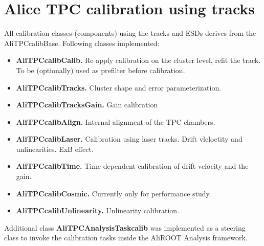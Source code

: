 \documentclass[a4paper,12pt]{article}
\begin{document}
\section{ Alice TPC calibration using tracks}


All calibration classes (components) using the tracks and ESDs derives from the AliTPCcalibBase.
Following classes implemented:
\begin{itemize}
\item {\bf{AliTPCcalibCalib.}}      Re-apply calibration on the cluster level, refit the track. To be (optionally) used as prefilter before calibration. 
\item {\bf{AliTPCcalibTracks.}}     Cluster shape and error parameterization.
\item {\bf{AliTPCcalibTracksGain.}} Gain calibration
\item {\bf{AliTPCcalibAlign.}}      Internal alignment of the TPC chambers.
\item {\bf{AliTPCcalibLaser.}}      Calibration using laser tracks. Drift vleloctity and unlinearities. ExB effect.
\item {\bf{AliTPCcalibTime.}}       Time dependent calibration of drift velocity and the gain.
\item {\bf{AliTPCcalibCosmic.}}     Currently only for performance study.
\item {\bf{AliTPCcalibUnlinearity.}} Unlinearity calibration.
\end{itemize}

Additional class {\bf{AliTPCAnalysisTaskcalib}} was implemented as a steering class to invoke the calibration tasks inside the AliROOT Analysis framework. 
\end{document}
